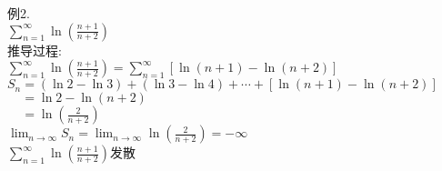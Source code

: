 例2.\\
\phantom{例}$\displaystyle\sum_{n=1}^\infty\ln(\frac{n+1}{n+2})$\\
推导过程:\\
$\displaystyle\sum_{n=1}^\infty\ln(\frac{n+1}{n+2})=\sum_{n=1}^\infty[\ln(n+1)-\ln(n+2)]$\\
$\displaystyle S_n=(\ln 2-\ln 3)+(\ln 3-\ln 4)+\cdots+[\ln(n+1)-\ln(n+2)]$\\
$\displaystyle\phantom{S_n}=\ln 2-\ln(n+2)$\\
$\displaystyle\phantom{S_n}=\ln(\frac{2}{n+2})$\\
$\displaystyle\lim_{n\to\infty}S_n=\lim_{n\to\infty}\ln(\frac{2}{n+2})=-\infty$\\
$\displaystyle\sum_{n=1}^\infty\ln(\frac{n+1}{n+2})$发散

